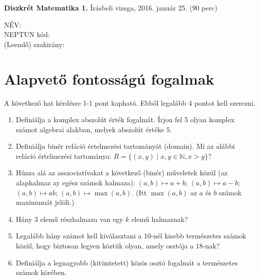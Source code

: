 \documentclass[11pt,a4paper]{article}
\begin{document}
\thispagestyle{empty}

\begin{center}
\begin{large}
\noindent \textbf{Diszkrét Matematika 1.} Írásbeli vizsga, 2016. január 25. (90 perc)
\end{large}
\end{center}

{\noindent NÉV: \\ NEPTUN kód:\\ (Leendő) szakirány:\\}
\section{Alapvető fontosságú fogalmak}
A következő hat kérdésre 1-1 pont kapható. Ebből legalább 4 pontot kell szerezni.
\begin{enumerate}\setlength{\itemsep}{3cm}

\item Definiálja a komplex abszolút érték fogalmát. Írjon fel 5 olyan komplex számot algebrai alakban, melyek abszolút értéke $5$.\vspace{-.5cm}
\item Definiálja binér reláció értelmezési tartományát (domain). Mi az alábbi reláció értelmezési tartománya: $R = \{ (x,y)\mid x,y\in \mathbb{N}, x> y\}$?
\item Húzza alá az asszociatívakat a következő (binér) műveletek közül (az alaphalmaz ay egész számok halmaza): $(a,b)\mapsto a+b$; $(a,b)\mapsto a-b$; $(a,b)\mapsto ab$; $(a,b)\mapsto \max(a,b)$. (Itt $\max(a,b)$ az $a$ és $b$ számok maximumát jelöli.)\vspace{-1.2cm}
\item Hány 3 elemű részhalmaza van egy $k$ elemű halmaznak?\vspace{-1cm}
\item Legalább hány számot kell kiválasztani a 10-nél kisebb természetes számok közül, hogy biztosan legyen köztük olyan, amely osztója a $18$-nak?
\item Definiálja a legnagyobb (kitüntetett) közös osztó fogalmát a természetes számok körében.
\end{enumerate}

\newpage
\end{document}
